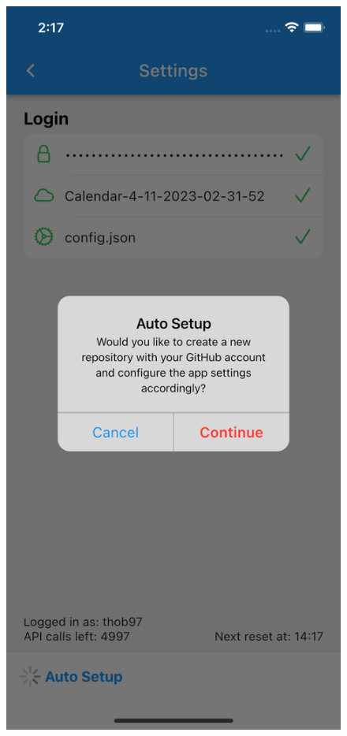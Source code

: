 \begin{figure}
\begin{minipage}{.5\textwidth}
  \centering
  \includegraphics[width=0.9\linewidth]{res/settings_page_alert.png}
  \label{fig:settings_page_alert}
\end{minipage}%
\end{figure}

